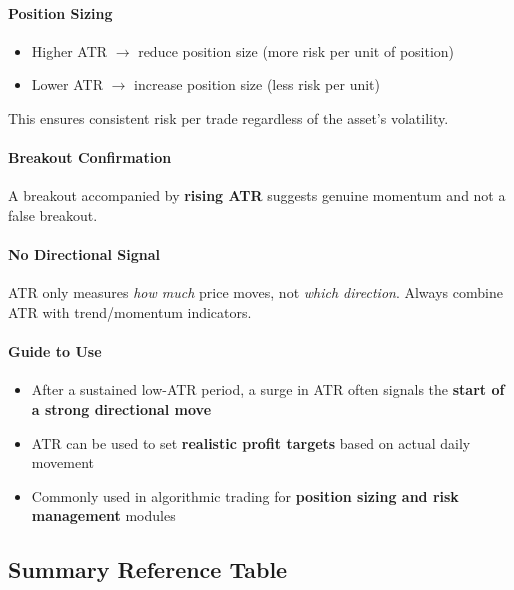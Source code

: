 \documentclass[12pt,openany]{book}
\begin{document}
\paragraph{Position Sizing}
\begin{itemize}[leftmargin=*]
    \item Higher ATR \(\rightarrow\) reduce position size (more risk per unit of position)
    \item Lower ATR \(\rightarrow\) increase position size (less risk per unit)
\end{itemize}

This ensures consistent risk per trade regardless of the asset's volatility.

\paragraph{Breakout Confirmation}
A breakout accompanied by \textbf{rising ATR} suggests genuine momentum and not a false breakout.

\paragraph{No Directional Signal}
ATR only measures \emph{how much} price moves, not \emph{which direction}. Always combine ATR with trend/momentum indicators.

\paragraph{Guide to Use}
\begin{itemize}[leftmargin=*]
    \item After a sustained low-ATR period, a surge in ATR often signals the \textbf{start of a strong directional move}
    \item ATR can be used to set \textbf{realistic profit targets} based on actual daily movement
    \item Commonly used in algorithmic trading for \textbf{position sizing and risk management} modules
\end{itemize}

\subsection{Summary Reference Table}
\end{document}
